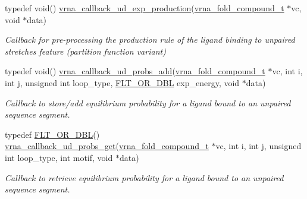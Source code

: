 \begin{DoxyCompactItemize}
typedef void() \mbox{\hyperlink{group__domains__up_ga33d78327dcd04c1ca5ab2887edc18c7b}{vrna\+\_\+callback\+\_\+ud\+\_\+exp\+\_\+production}}(\mbox{\hyperlink{group__fold__compound_ga1b0cef17fd40466cef5968eaeeff6166}{vrna\+\_\+fold\+\_\+compound\+\_\+t}} $\ast$vc, void $\ast$data)
\begin{DoxyCompactList}\small\item\em Callback for pre-\/processing the production rule of the ligand binding to unpaired stretches feature (partition function variant) \end{DoxyCompactList}\item 
typedef void() \mbox{\hyperlink{group__domains__up_gab10498abc84fcaf336aca8f8d7d42eb2}{vrna\+\_\+callback\+\_\+ud\+\_\+probs\+\_\+add}}(\mbox{\hyperlink{group__fold__compound_ga1b0cef17fd40466cef5968eaeeff6166}{vrna\+\_\+fold\+\_\+compound\+\_\+t}} $\ast$vc, int i, int j, unsigned int loop\+\_\+type, \mbox{\hyperlink{group__data__structures_ga31125aeace516926bf7f251f759b6126}{F\+L\+T\+\_\+\+O\+R\+\_\+\+D\+BL}} exp\+\_\+energy, void $\ast$data)
\begin{DoxyCompactList}\small\item\em Callback to store/add equilibrium probability for a ligand bound to an unpaired sequence segment. \end{DoxyCompactList}\item 
typedef \mbox{\hyperlink{group__data__structures_ga31125aeace516926bf7f251f759b6126}{F\+L\+T\+\_\+\+O\+R\+\_\+\+D\+BL}}() \mbox{\hyperlink{group__domains__up_gaa10ba1b6f1e179ea84c5caca9cdaae67}{vrna\+\_\+callback\+\_\+ud\+\_\+probs\+\_\+get}}(\mbox{\hyperlink{group__fold__compound_ga1b0cef17fd40466cef5968eaeeff6166}{vrna\+\_\+fold\+\_\+compound\+\_\+t}} $\ast$vc, int i, int j, unsigned int loop\+\_\+type, int motif, void $\ast$data)
\begin{DoxyCompactList}\small\item\em Callback to retrieve equilibrium probability for a ligand bound to an unpaired sequence segment. \end{DoxyCompactList}\end{DoxyCompactItemize}
